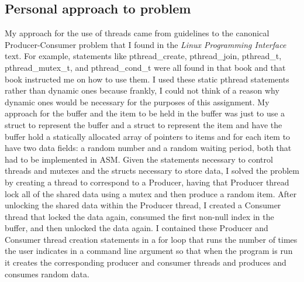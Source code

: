 \documentclass[letterpaper,10pt,titlepage]{article}
\begin{document}
\subsection{Personal approach to problem}
My approach for the use of threads came from guidelines to the canonical Producer-Consumer problem that I found in the \emph{Linux Programming Interface} text. For example, statements like pthread\_create, pthread\_join, pthread\_t, pthread\_mutex\_t, and pthread\_cond\_t were all found in that book and that book instructed me on how to use them. I used these static pthread statements rather than dynamic ones because frankly, I could not think of a reason why dynamic ones would be necessary for the purposes of this assignment. My approach for the buffer and the item to be held in the buffer was just to use a struct to represent the buffer and a struct to represent the item and have the buffer hold a statically allocated array of pointers to items and for each item to have two data fields: a random number and a random waiting period, both that had to be implemented in ASM. Given the statements necessary to control threads and mutexes and the structs necessary to store data, I solved the problem by creating a thread to correspond to a Producer, having that Producer thread lock all of the shared data using a mutex and then produce a random item. After unlocking the shared data within the Producer thread, I created a Consumer thread that locked the data again, consumed the first non-null index in the buffer, and then unlocked the data again. I contained these Producer and Consumer thread creation statements in a for loop that runs the number of times the user indicates in a command line argument so that when the program is run it creates the corresponding producer and consumer threads and produces and consumes random data. 
\end{document}
